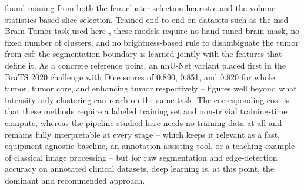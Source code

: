 found missing from both the \gls{fcm} cluster-selection heuristic and the volume-statistics-based slice selection. Trained end-to-end on datasets such as the \gls{msd} Brain Tumor task used here \cite{antonelli2022medical}, these models require no hand-tuned brain mask, no fixed number of clusters, and no brightness-based rule to disambiguate the tumor from \gls{csf}: the segmentation boundary is learned jointly with the features that define it. As a concrete reference point, an nnU-Net variant placed first in the BraTS 2020 challenge with Dice scores of 0.890, 0.851, and 0.820 for whole tumor, tumor core, and enhancing tumor respectively \cite{isensee2020brats} -- figures well beyond what intensity-only clustering can reach on the same task. The corresponding cost is that these methods require a labeled training set and non-trivial training-time compute, whereas the pipeline studied here needs no training data at all and remains fully interpretable at every stage -- which keeps it relevant as a fast, equipment-agnostic baseline, an annotation-assisting tool, or a teaching example of classical image processing -- but for raw segmentation and edge-detection accuracy on annotated clinical datasets, deep learning is, at this point, the dominant and recommended approach.
